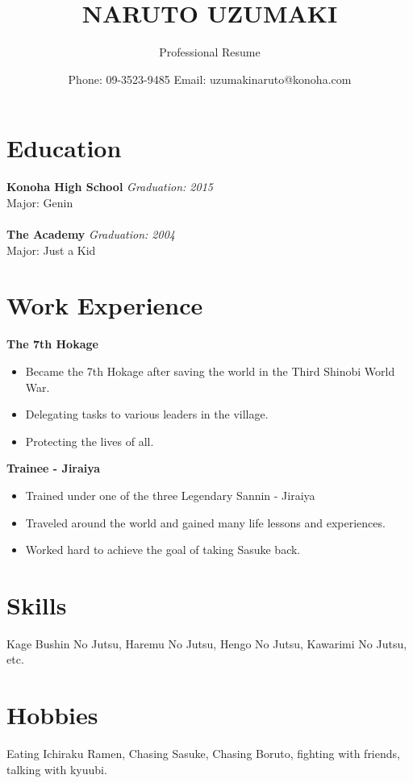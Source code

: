 \documentclass{article}
\title{NARUTO UZUMAKI}
\author{Professional Resume}
\date{Phone: 09-3523-9485 Email: uzumakinaruto@konoha.com}
\begin{document}
\maketitle
\section{Education}
\textbf{Konoha High School}
\textit{Graduation: 2015} \\
Major: Genin \\ \\
\textbf{The Academy}
\textit{Graduation: 2004} \\
Major: Just a Kid 

\section{Work Experience}
\textbf{The 7th Hokage} 
\begin{itemize}
    \item Became the 7th Hokage after saving the world in the Third Shinobi World War.
    \item Delegating tasks to various leaders in the village.
    \item Protecting the lives of all.
\end{itemize}
\textbf{Trainee - Jiraiya}
\begin{itemize}
    \item Trained under one of the three Legendary Sannin - Jiraiya
    \item Traveled around the world and gained many life lessons and experiences.
    \item Worked hard to achieve the goal of taking Sasuke back.
\end{itemize}

\section{Skills}

Kage Bushin No Jutsu, Haremu No Jutsu, Hengo No Jutsu, Kawarimi No Jutsu, etc. \\
\section{Hobbies}
Eating Ichiraku Ramen, Chasing Sasuke, Chasing Boruto, fighting with friends, talking with kyuubi.
\end{document}
